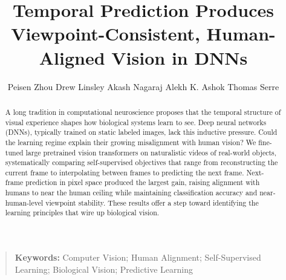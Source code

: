 \documentclass[submission]{ccn}  %
\title{Temporal Prediction Produces Viewpoint-Consistent, Human-Aligned Vision in DNNs}
\author{%
  Peisen Zhou\affmark{1} \And
  Drew Linsley\affmark{1} \And
  Akash Nagaraj\affmark{1} \And
  Alekh K. Ashok\affmark{1} \AND
  Thomas Serre\affmark{1}%
}
\affiliation{1}{Department of Cognitive and Psychological Sciences, Brown University\\ Providence, RI, USA}
\begin{document}
\maketitle
\cleardoublepage

\begin{abstract}
A long tradition in computational neuroscience proposes that the temporal structure of visual experience shapes how biological systems learn to see. Deep neural networks (DNNs), typically trained on static labeled images, lack this inductive pressure. Could the learning regime explain their growing misalignment with human vision? We fine-tuned large pretrained vision transformers on naturalistic videos of real-world objects, systematically comparing self-supervised objectives that range from reconstructing the current frame to interpolating between frames to predicting the next frame. Next-frame prediction in pixel space produced the largest gain, raising alignment with humans to near the human ceiling while maintaining classification accuracy and near-human-level viewpoint stability. These results offer a step toward identifying the learning principles that wire up biological vision.
\end{abstract}

\begin{quote}
\small
\textbf{Keywords:} Computer Vision; Human Alignment; Self-Supervised Learning; Biological Vision; Predictive Learning
\end{quote}
\end{document}
